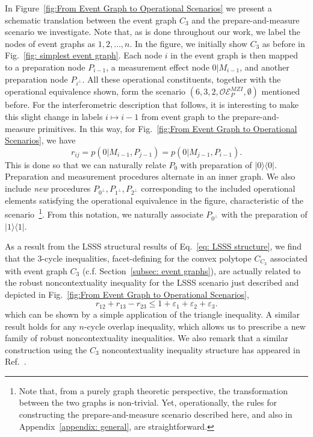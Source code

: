 \documentclass[a4paper,twocolumn,11pt,accepted=2024-01-17]{quantumarticle}
\begin{document}
{In Figure~\ref{fig:From Event Graph to Operational Scenarios} we present a schematic translation between the event graph $C_3$ and the prepare-and-measure scenario we investigate. Note that, as is done throughout our work, we label the nodes of event graphs as $1,2,\dots,n$. In the figure, we initially show $C_3$ as before in Fig.~\ref{fig: simplest event graph}. Each node $i$ in the event graph is then mapped to a preparation node $P_{i-1}$, a measurement effect node $0|M_{i-1}$, and another preparation node $P_{i^\perp}$. All these operational constituents, together with the operational equivalence shown, form the scenario $(6,3,2,\mathcal{OE}_P^{MZI},\emptyset)$ mentioned before. For the interferometric description that follows, it is interesting to make this slight change in labels $i \mapsto i-1$ from event graph to the prepare-and-measure primitives. In this way, for Fig.~\ref{fig:From Event Graph to Operational Scenarios}, we have $$r_{ij} = p(0|M_{i-1},P_{j-1}) = p(0|M_{j-1}, P_{i-1}).$$ This is done so that we can naturally relate $P_0$ with preparation of $\vert 0\rangle \langle 0 \vert$. Preparation and measurement procedures alternate in an inner graph. We also include \emph{new} procedures $P_{0^\perp}, P_{1^\perp}, P_{2^\perp}$ corresponding to the included operational elements satisfying the operational equivalence in the figure, characteristic of the scenario~\footnote{Note that, from a purely graph theoretic perspective, the transformation between the two graphs is non-trivial. Yet, operationally, the rules for constructing the prepare-and-measure scenario described here, and also in Appendix~\ref{appendix: general}, are straightforward.}. From this notation, we naturally associate $P_{0^\perp}$ with the preparation of $\vert 1\rangle \langle 1 \vert$. }

As a result from the LSSS structural results of Eq.~\eqref{eq: LSSS structure}, we find that the {3-cycle inequalities, facet-defining for the convex polytope  $C_{C_3}$ associated with event graph $C_3$ (c.f. Section~\ref{subsec: event graphs}), are} actually related to the robust noncontextuality inequality for the LSSS scenario just described and depicted in Fig.~\ref{fig:From Event Graph to Operational Scenarios},
\begin{equation}\label{eq: robust c3 inequality}
    r_{12}+r_{13}-r_{23} \leq 1 + \varepsilon_1+\varepsilon_2+\varepsilon_3.
\end{equation}
which can be shown by a simple application of the triangle inequality. A similar result holds for any $n$-cycle overlap inequality, which allows us to prescribe a new family of robust noncontextuality inequalities. We also remark that a similar construction using the $C_3$ noncontextuality inequality structure has appeared in Ref.~\cite{flatt2021contextual}.
\end{document}
